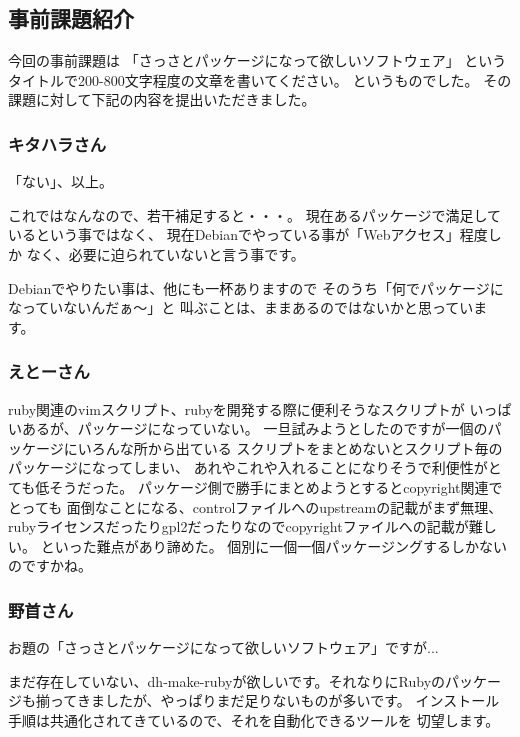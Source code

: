\documentclass[mingoth,a4paper]{jsarticle}
\begin{document}
\subsection{事前課題紹介}

今回の事前課題は
「さっさとパッケージになって欲しいソフトウェア」
というタイトルで200-800文字程度の文章を書いてください。
というものでした。
その課題に対して下記の内容を提出いただきました。

\subsubsection{キタハラさん}

    「ない」、以上。

    これではなんなので、若干補足すると・・・。
現在あるパッケージで満足しているという事ではなく、
現在Debianでやっている事が「Webアクセス」程度しか
なく、必要に迫られていないと言う事です。

    Debianでやりたい事は、他にも一杯ありますので
そのうち「何でパッケージになっていないんだぁ〜」と
叫ぶことは、ままあるのではないかと思っています。

\subsubsection{えとーさん}

ruby関連のvimスクリプト、rubyを開発する際に便利そうなスクリプトが
いっぱいあるが、パッケージになっていない。
一旦試みようとしたのですが一個のパッケージにいろんな所から出ている
スクリプトをまとめないとスクリプト毎のパッケージになってしまい、
あれやこれや入れることになりそうで利便性がとても低そうだった。
パッケージ側で勝手にまとめようとするとcopyright関連でとっても
面倒なことになる、controlファイルへのupstreamの記載がまず無理、
rubyライセンスだったりgpl2だったりなのでcopyrightファイルへの記載が難しい。
といった難点があり諦めた。
個別に一個一個パッケージングするしかないのですかね。

\subsubsection{野首さん}

お題の「さっさとパッケージになって欲しいソフトウェア」ですが...

まだ存在していない、dh-make-rubyが欲しいです。それなりにRubyのパッケー
ジも揃ってきましたが、やっぱりまだ足りないものが多いです。
インストール手順は共通化されてきているので、それを自動化できるツールを
切望します。
\end{document}

